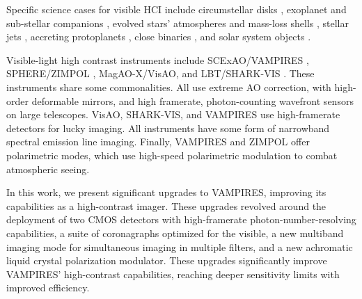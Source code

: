 Specific science cases for visible HCI include circumstellar disks \citep{benisty_optical_2022}, exoplanet and sub-stellar companions \citep{hunziker_refplanets_2020}, evolved stars' atmospheres and mass-loss shells \citep{norris_vampires_2015}, stellar jets \citep{schmid_spherezimpol_2017,uyama_monitoring_2022}, accreting protoplanets \citep{uyama_high-contrast_2020,benisty_circumplanetary_2021}, close binaries \citep{mcclure_binary_1980,escorza_barium_2019}, and solar system objects \citep{schmid_limb_2006,vernazza_vltsphere_2021}.

Visible-light high contrast instruments include SCExAO/VAMPIRES \citep{norris_vampires_2015}, SPHERE/ZIMPOL \citep{schmid_spherezimpol_2018}, MagAO-X/VisAO, and LBT/SHARK-VIS \citep{mattioli_shark-vis_2018}. These instruments share some commonalities. All use extreme AO correction, with high-order deformable mirrors, and high framerate, photon-counting wavefront sensors on large telescopes. VisAO, SHARK-VIS, and VAMPIRES use high-framerate detectors for lucky imaging. All instruments have some form of narrowband spectral emission line imaging. Finally, VAMPIRES and ZIMPOL offer polarimetric modes, which use high-speed polarimetric modulation to combat atmospheric seeing.

In this work, we present significant upgrades to VAMPIRES, improving its capabilities as a high-contrast imager. These upgrades revolved around the deployment of two CMOS detectors with high-framerate photon-number-resolving capabilities, a suite of coronagraphs optimized for the visible, a new multiband imaging mode for simultaneous imaging in multiple filters, and a new achromatic liquid crystal polarization modulator. These upgrades significantly improve VAMPIRES' high-contrast capabilities, reaching deeper sensitivity limits with improved efficiency.
